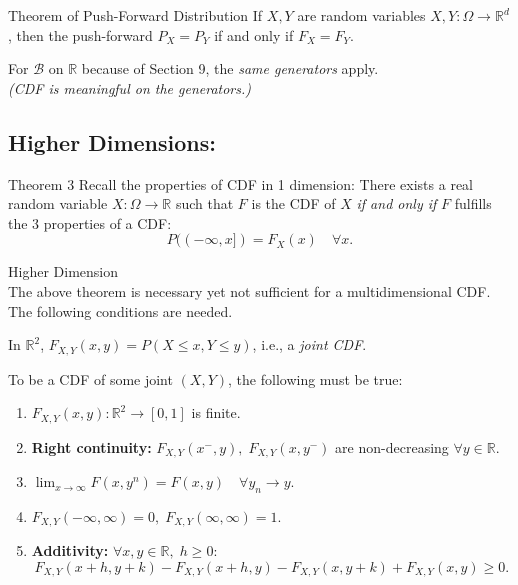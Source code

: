 \begin{thm}{Theorem of Push-Forward Distribution}
\noindent If \( X, Y \) are random variables \( X, Y: \Omega \to \mathbb{R}^d \), then the push-forward \( P_X = P_Y \) if and only if \( F_X = F_Y \).
\end{thm}

\begin{rmk}
For \( \mathscr{B} \) on \( \mathbb{R} \) because of Section 9, the \textit{same generators} apply. \\
\textit{(CDF is meaningful on the generators.)}
\end{rmk}

\subsection{Higher Dimensions:}
\begin{thm}{Theorem 3}
\noindent Recall the properties of CDF in 1 dimension:
There exists a real random variable \( X: \Omega \to \mathbb{R} \) such that \( F \) is the CDF of \( X \) \textit{if and only if} \( F \) fulfills the 3 properties of a CDF:
\[
P((-\infty, x]) = F_X(x) \quad \forall x.
\]
\end{thm}

\begin{rmk}{Higher Dimension}\\
The above theorem is necessary yet not sufficient for a multidimensional CDF. The following conditions are needed. 
\end{rmk}

\noindent In \( \mathbb{R}^2 \), \( F_{X,Y}(x,y) = P(X \leq x, Y \leq y) \), i.e., a \textit{joint CDF}.

To be a CDF of some joint \( (X, Y) \), the following must be true:
\begin{enumerate}
    \item \( F_{X,Y}(x,y): \mathbb{R}^2 \to [0, 1] \) is finite.
    \item \textbf{Right continuity:} \( F_{X,Y}(x^-, y), \; F_{X,Y}(x, y^-) \) are non-decreasing \( \forall y \in \mathbb{R} \).
    \item \( \lim_{x \to \infty} F(x, y^n) = F(x, y) \quad \forall y_n \to y \).
    \item \( F_{X,Y}(-\infty, \infty) = 0, \; F_{X,Y}(\infty, \infty) = 1 \).
    \item \textbf{Additivity:} \( \forall x, y \in \mathbb{R}, \; h \geq 0 \):
    \[
    F_{X,Y}(x+h, y+k) - F_{X,Y}(x+h, y) - F_{X,Y}(x, y+k) + F_{X,Y}(x, y) \geq 0.
    \]
\end{enumerate}


